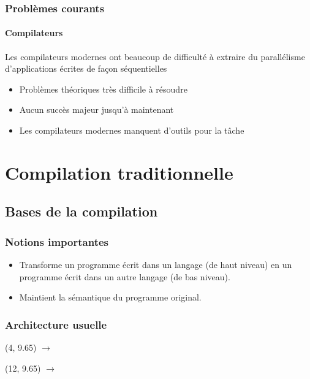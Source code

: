 \documentclass{beamer}
\begin{document}
\begin{frame}
\frametitle{Problèmes courants}
\framesubtitle{Compilateurs}
Les compilateurs modernes ont beaucoup de difficulté à extraire du parallélisme d'applications écrites de façon séquentielles
\begin{itemize}
\item Problèmes théoriques très difficile à résoudre
\item Aucun succès majeur jusqu'à maintenant
\item Les compilateurs modernes manquent d'outils pour la tâche
\end{itemize}
\end{frame}

\section{Compilation traditionnelle}
\subsection{Bases de la compilation}
\begin{frame}
\frametitle{Notions importantes}
\begin{itemize}
\item Transforme un programme écrit dans un langage (de haut niveau) en un programme écrit dans un autre langage (de bas niveau).
\item Maintient la sémantique du programme original.
\end{itemize}
\end{frame}

\begin{frame}
\frametitle{Architecture usuelle}
\begin{center}
\end{center}
\begin{textblock}{6}(4, 9.65)
	$\rightarrow$
\end{textblock}
\begin{textblock}{6}(12, 9.65)
	$\rightarrow$
\end{textblock}
\end{frame}
\end{document}
